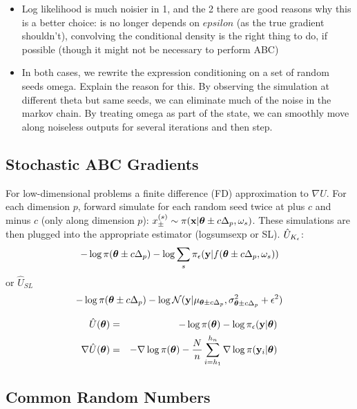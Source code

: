 \documentclass[]{article}
\begin{document}
\begin{itemize}
  \item Log likelihood is much noisier in  1, and the 2 there are good reasons why this is a better choice: is no longer depends on $epsilon$ (as the true gradient shouldn't), convolving the conditional density is the right thing to do, if possible (though it might not be necessary to perform ABC)
  \item In both cases, we rewrite the expression conditioning on a set of random seeds omega.  Explain the reason for this.  By observing the simulation at different theta but same seeds, we can eliminate much of the noise in the markov chain.  By treating omega as part of the state, we can smoothly move along noiseless outputs for several iterations and then step.
\end{itemize}

\subsection{Stochastic ABC Gradients}
For low-dimensional problems a finite difference (FD) approximation to $\nabla U$.  For each dimension $p$, forward simulate for each random seed twice at plus $c$ and minus $c$ (only along dimension $p$): $x_{\pm}^{(s)} \sim \pi( {\bf x} | {\bm \theta} \pm c \Delta_p, \omega_s)$.  These simulations are then plugged into the appropriate estimator (logsumsexp or SL).  $\hat{U}_{K_{\epsilon}}$:
\begin{eqnarray}
  - \log \pi({\bm \theta} \pm c \Delta_p) - \log \sum_s \pi_{\epsilon}({\bf y} | f( {\bm \theta} \pm c \Delta_p, \omega_s ) )
\end{eqnarray}   
or $\hat{U}_{SL}$
\begin{eqnarray}
  - \log \pi({\bm \theta} \pm c \Delta_p) - \log \mathcal{N}({\bf y} | \mu_{{\bm \theta} \pm c \Delta_p}, \sigma^2_{{\bm \theta} \pm c \Delta_p} + \epsilon^2 )
\end{eqnarray}


\begin{eqnarray}
  \hat{U}({\bm \theta})       & = & - \log \pi({\bm \theta}) - \log \pi_{\epsilon}({\bf y} | {\bm \theta} ) \\
  \nabla\hat{U}({\bm \theta}) & = & - \nabla \log \pi({\bm \theta}) - \frac{N}{n} \sum_{i=h_1}^{h_n} \nabla \log \pi({\bf y}_i | {\bm \theta} ) 
\end{eqnarray} 

\subsection{Common Random Numbers}
\end{document}
